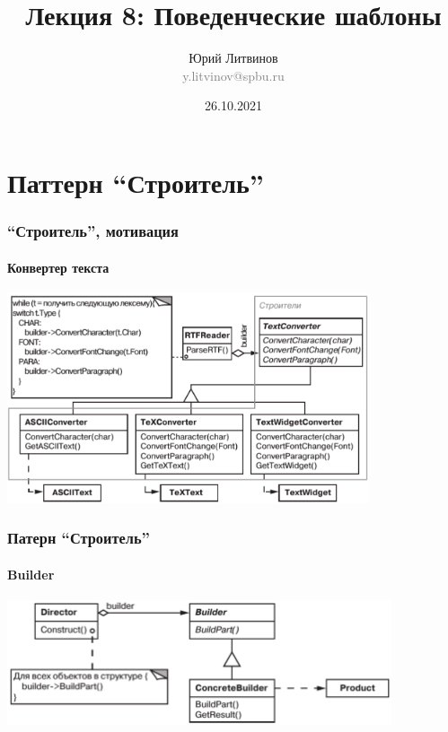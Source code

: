 \documentclass[xetex,mathserif,serif]{beamer}
\title[Шаблоны]{Лекция 8: Поведенческие шаблоны}
\author[Юрий Литвинов]{Юрий Литвинов\\\small{\textcolor{gray}{y.litvinov@spbu.ru}}}
\date{26.10.2021}
\begin{document}
    \frame{\titlepage}

    \section{Паттерн ``Строитель''}

    \begin{frame}
        \frametitle{``Строитель'', мотивация}
        \framesubtitle{Конвертер текста}
        \begin{center}
            \includegraphics[width=0.8\textwidth]{textConverter.png}
        \end{center}
    \end{frame}

    \begin{frame}
        \frametitle{Патерн ``Строитель''}
        \framesubtitle{Builder}
        \begin{center}
            \includegraphics[width=0.85\textwidth]{builder.png}
        \end{center}
    \end{frame}
    
\end{document}
